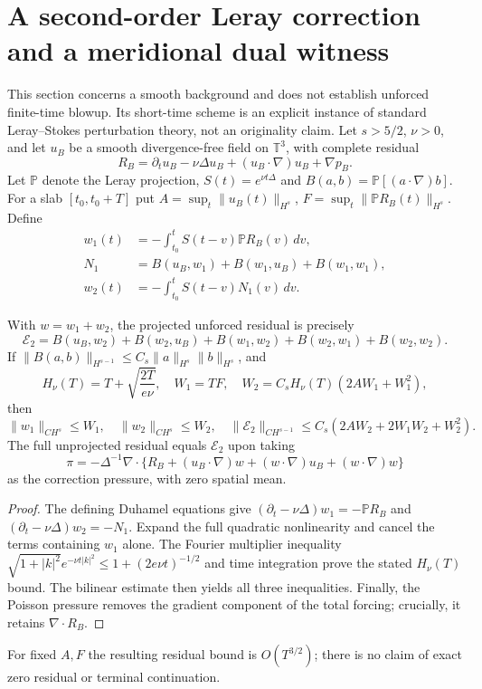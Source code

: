 
\section{A second-order Leray correction and a meridional dual witness}
\label{sec:second-order-leray}
This section concerns a smooth background and does not establish unforced
finite-time blowup. Its short-time scheme is an explicit instance of standard
Leray--Stokes perturbation theory, not an originality claim.
Let $s>5/2$, $\nu>0$, and let $u_B$ be a smooth divergence-free field on
$\mathbb T^3$, with complete residual
\[
R_B=\partial_tu_B-\nu\Delta u_B+(u_B\cdot\nabla)u_B+\nabla p_B.
\]
Let $\mathbb P$ denote the Leray projection,
$S(t)=e^{\nu t\Delta}$ and
$B(a,b)=\mathbb P[(a\cdot\nabla)b]$.
For a slab $[t_0,t_0+T]$ put
$A=\sup_t\|u_B(t)\|_{H^s}$,
$F=\sup_t\|\mathbb P R_B(t)\|_{H^s}$.
Define
\begin{align*}
w_1(t)&=-\int_{t_0}^tS(t-v)\mathbb P R_B(v)\,dv,\\
N_1&=B(u_B,w_1)+B(w_1,u_B)+B(w_1,w_1),\\
w_2(t)&=-\int_{t_0}^t S(t-v)N_1(v)\,dv.
\end{align*}
\begin{proposition}
With $w=w_1+w_2$, the projected unforced residual is precisely
\[
\mathcal E_2=B(u_B,w_2)+B(w_2,u_B)+B(w_1,w_2)
+B(w_2,w_1)+B(w_2,w_2).
\]
If $\|B(a,b)\|_{H^{s-1}}\le C_s\|a\|_{H^s}\|b\|_{H^s}$,
and
\[
H_\nu(T)=T+\sqrt{\frac{2T}{e\nu}},\quad
W_1=TF,\quad W_2=C_sH_\nu(T)(2AW_1+W_1^2),
\]
then
\[
\|w_1\|_{CH^s}\le W_1,\quad
\|w_2\|_{CH^s}\le W_2,\quad
\|\mathcal E_2\|_{CH^{s-1}}
\le C_s(2AW_2+2W_1W_2+W_2^2).
\]
The full unprojected residual equals $\mathcal E_2$ upon taking
\[
\pi=-\Delta^{-1}\nabla\cdot
\{R_B+(u_B\cdot\nabla)w+(w\cdot\nabla)u_B+(w\cdot\nabla)w\}
\]
as the correction pressure, with zero spatial mean.
\end{proposition}
\begin{proof}
The defining Duhamel equations give
$(\partial_t-\nu\Delta)w_1=-\mathbb P R_B$ and
$(\partial_t-\nu\Delta)w_2=-N_1$. Expand the full quadratic
nonlinearity and cancel the terms containing $w_1$ alone.
The Fourier multiplier inequality
$\sqrt{1+|k|^2}e^{-\nu t|k|^2}
\le1+(2e\nu t)^{-1/2}$
and time integration prove the stated $H_\nu(T)$ bound.
The bilinear estimate then yields all three inequalities.
Finally, the Poisson pressure removes the gradient component of the
total forcing; crucially, it retains $\nabla\cdot R_B$.
\end{proof}
For fixed $A,F$ the resulting residual bound is $O(T^{3/2})$;
there is no claim of exact zero residual or terminal continuation.

